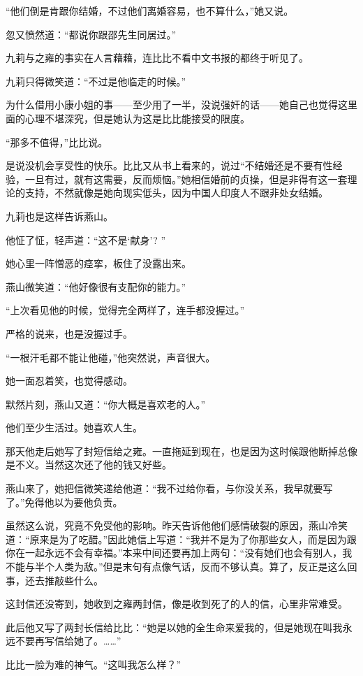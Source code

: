 \par “他们倒是肯跟你结婚，不过他们离婚容易，也不算什么，”她又说。
\par 忽又愤然道：“都说你跟邵先生同居过。”
\par 九莉与之雍的事实在人言藉藉，连比比不看中文书报的都终于听见了。
\par 九莉只得微笑道：“不过是他临走的时候。”
\par 为什么借用小康小姐的事——至少用了一半，没说强奸的话——她自己也觉得这里面的心理不堪深究，但是她认为这是比比能接受的限度。
\par “那多不值得，”比比说。
\par 是说没机会享受性的快乐。比比又从书上看来的，说过“不结婚还是不要有性经验，一旦有过，就有这需要，反而烦恼。”她相信婚前的贞操，但是非得有这一套理论的支持，不然就像是她向现实低头，因为中国人印度人不跟非处女结婚。
\par 九莉也是这样告诉燕山。
\par 他怔了怔，轻声道：“这不是‘献身’? ”
\par 她心里一阵憎恶的痉挛，板住了没露出来。
\par 燕山微笑道：“他好像很有支配你的能力。”
\par “上次看见他的时候，觉得完全两样了，连手都没握过。”
\par 严格的说来，也是没握过手。
\par “一根汗毛都不能让他碰，”他突然说，声音很大。
\par 她一面忍着笑，也觉得感动。
\par 默然片刻，燕山又道：“你大概是喜欢老的人。”
\par 他们至少生活过。她喜欢人生。
\par 那天他走后她写了封短信给之雍。一直拖延到现在，也是因为这时候跟他断掉总像是不义。当然这次还了他的钱又好些。
\par 燕山来了，她把信微笑递给他道：“我不过给你看，与你没关系，我早就要写了。”免得他以为要他负责。
\par 虽然这么说，究竟不免受他的影响。昨天告诉他他们感情破裂的原因，燕山冷笑道：“原来是为了吃醋。”因此她信上写道：“我并不是为了你那些女人，而是因为跟你在一起永远不会有幸福。”本来中间还要再加上两句：“没有她们也会有别人，我不能与半个人类为敌。”但是末句有点像气话，反而不够认真。算了，反正是这么回事，还去推敲些什么。
\par 这封信还没寄到，她收到之雍两封信，像是收到死了的人的信，心里非常难受。
\par 此后他又写了两封长信给比比：“她是以她的全生命来爱我的，但是她现在叫我永远不要再写信给她了。……”
\par 比比一脸为难的神气。“这叫我怎么样？”
